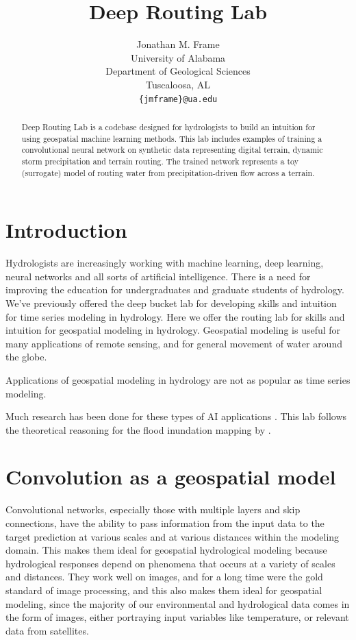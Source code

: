 \documentclass{article}
\title{Deep Routing Lab
}
\author{
  Jonathan M. Frame \\
  University of Alabama \\
  Department of Geological Sciences \\
  Tuscaloosa, AL\\
  \texttt{\{jmframe\}@ua.edu} \\
}
\begin{document}
\maketitle


\begin{abstract}
Deep Routing Lab is a codebase designed for hydrologists to build an intuition for using geospatial machine learning methods. This lab includes examples of training a convolutional neural network on synthetic data representing digital terrain, dynamic storm precipitation and terrain routing. The trained network represents a toy (surrogate) model of routing water from precipitation-driven flow across a terrain. 
\end{abstract}


\section{Introduction}
Hydrologists are increasingly working with machine learning, deep learning, neural networks and all sorts of artificial intelligence. There is a need for improving the education for undergraduates and graduate students of hydrology. We've previously offered the deep bucket lab for developing skills and intuition for time series modeling in hydrology. Here we offer the routing lab for skills and intuition for geospatial modeling in hydrology. Geospatial modeling is useful for many applications of remote sensing, and for general movement of water around the globe. 

Applications of geospatial modeling in hydrology are not as popular as time series modeling. 

Much research has been done for these types of AI applications \cite{behroozi2025sensitivity}. This lab follows the theoretical reasoning for the flood inundation mapping by \cite{frame2024rapid}.

\section{Convolution as a geospatial model}
\label{sec:conv}
Convolutional networks, especially those with multiple layers and skip connections, have the ability to pass information from the input data to the target prediction at various scales and at various distances within the modeling domain. This makes them ideal for geospatial hydrological modeling because hydrological responses depend on phenomena that occurs at a variety of scales and distances. They work well on images, and for a long time were the gold standard of image processing, and this also makes them ideal for geospatial modeling, since the majority of our environmental and hydrological data comes in the form of images, either portraying input variables like temperature, or relevant data from satellites.
\end{document}
